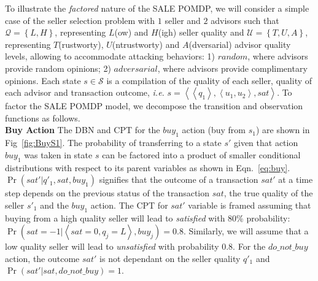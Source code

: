 \documentclass{aamas2014}
\providecommand{\SALEP}{SALE POMDP}
\begin{document}
To illustrate the \textit{factored} nature of the \SALEP{}, we will consider a simple case of the seller selection problem with $1$ seller and $2$ advisors such that $\mathcal{Q}=\left\{ L,H\right\} $, representing $L$(ow) and $H$(igh) seller quality and $\mathcal{U}=\left\{ T,U, A\right\} $, representing $T$(rustworty), $U$(ntrustworty) and $A$(dversarial) advisor quality levels, allowing to accommodate attacking behaviors: 1) $random$, where advisors provide random opinions; 2) $adversarial$, where advisors provide complimentary opinions. Each state $s \in \mathcal{S}$ is a compilation of the quality of each seller, quality of each advisor and transaction outcome, \textit{i.e.} $s=\left\langle \left\langle q_1\right\rangle, \left\langle u_1, u_2\right\rangle, sat\right\rangle$. To factor the \SALEP{} model, we decompose the transition and observation functions as follows.\\
 \textbf{Buy Action} The DBN and CPT for the $buy_{1}$ action  (buy from $s_1$) are shown in Fig~\ref{fig:BuyS1}. The probability of transferring to a state $s'$ given that action $buy_{1}$ was taken in state $s$ can be factored into a product of smaller conditional distributions with respect to its parent variables as shown in Eqn.~\ref{eq:buy}.  $\Pr(sat'|q'_1,sat,buy_{1})$ signifies that the outcome of a transaction $sat'$ at a time step depends on the previous status of the transaction $sat$, the true quality of the seller $s'_1$ and the $buy_{1}$ action. The CPT for $sat'$ variable is framed assuming that buying from a high quality seller will lead to \emph{satisfied} with 80\% probability: $ \Pr(sat=-1|\left\langle sat=0,q_{j}=L\right\rangle ,buy_{j})=0.8$. Similarly, we will assume that a low quality seller will lead to \emph{unsatisfied} with probability $0.8$. For the $do\_not\_buy$ action, the outcome $sat'$ is not dependant on the seller quality $q'_1$ and $\Pr(sat'|sat,do\_not\_buy)=1$.\\
\vspace{-5mm}
\end{document}
